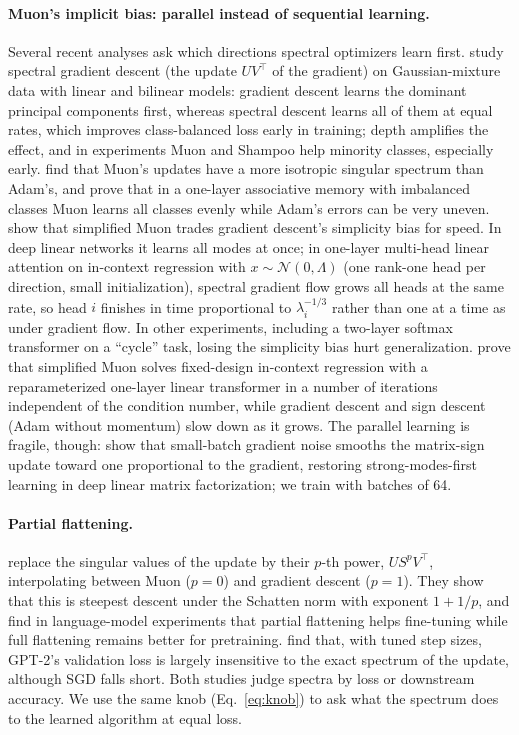 \paragraph{Muon's implicit bias: parallel instead of sequential learning.} Several recent analyses ask which directions spectral optimizers learn first. \citet{vasudeva2025} study spectral gradient descent (the update $UV^\top$ of the gradient) on Gaussian-mixture data with linear and bilinear models: gradient descent learns the dominant principal components first, whereas spectral descent learns all of them at equal rates, which improves class-balanced loss early in training; depth amplifies the effect, and in experiments Muon and Shampoo help minority classes, especially early. \citet{wang2025muon} find that Muon's updates have a more isotropic singular spectrum than Adam's, and prove that in a one-layer associative memory with imbalanced classes Muon learns all classes evenly while Adam's errors can be very uneven. \citet{dragutinovic2026} show that simplified Muon trades gradient descent's simplicity bias for speed. In deep linear networks it learns all modes at once; in one-layer multi-head linear attention on in-context regression with $x \sim \mathcal N(0,\Lambda)$ (one rank-one head per direction, small initialization), spectral gradient flow grows all heads at the same rate, so head $i$ finishes in time proportional to $\lambda_i^{-1/3}$ rather than one at a time as under gradient flow. In other experiments, including a two-layer softmax transformer on a ``cycle'' task, losing the simplicity bias hurt generalization. \citet{ma2026} prove that simplified Muon solves fixed-design in-context regression with a reparameterized one-layer linear transformer in a number of iterations independent of the condition number, while gradient descent and sign descent (Adam without momentum) slow down as it grows. The parallel learning is fragile, though: \citet{jacobs2026} show that small-batch gradient noise smooths the matrix-sign update toward one proportional to the gradient, restoring strong-modes-first learning in deep linear matrix factorization; we train with batches of 64.

\paragraph{Partial flattening.} \citet{dong2026muonp} replace the singular values of the update by their $p$-th power, $US^pV^\top$, interpolating between Muon ($p=0$) and gradient descent ($p=1$). They show that this is steepest descent under the Schatten norm with exponent $1 + 1/p$, and find in language-model experiments that partial flattening helps fine-tuning while full flattening remains better for pretraining. \citet{shumaylov2026} find that, with tuned step sizes, GPT-2's validation loss is largely insensitive to the exact spectrum of the update, although SGD falls short. Both studies judge spectra by loss or downstream accuracy. We use the same knob (Eq.~\ref{eq:knob}) to ask what the spectrum does to the learned algorithm at equal loss.


